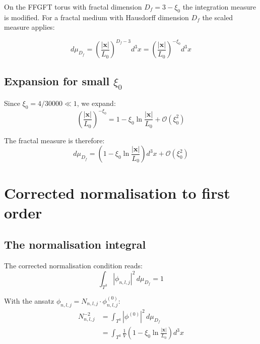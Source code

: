On the FFGFT torus with fractal dimension $D_f = 3-\xi_0$ the
integration measure is modified. For a fractal medium with
Hausdorff dimension $D_f$ the scaled measure applies:

\begin{equation}
  d\mu_{D_f} = \left(\frac{|\mathbf{x}|}{L_0}\right)^{D_f - 3} d^3x
  = \left(\frac{|\mathbf{x}|}{L_0}\right)^{-\xi_0} d^3x
  \label{eq:fraktales-mass}
\end{equation}

\subsection{Expansion for small \texorpdfstring{$\xi_0$}{xi0}}

Since $\xi_0 = 4/30000 \ll 1$, we expand:
\begin{equation}
  \left(\frac{|\mathbf{x}|}{L_0}\right)^{-\xi_0}
  = 1 - \xi_0 \ln\frac{|\mathbf{x}|}{L_0} + \mathcal{O}(\xi_0^2)
  \label{eq:entwicklung}
\end{equation}

The fractal measure is therefore:
\begin{equation}
  d\mu_{D_f} = \left(1 - \xi_0\ln\frac{|\mathbf{x}|}{L_0}\right)d^3x
  + \mathcal{O}(\xi_0^2)
  \label{eq:mass-entwickelt}
\end{equation}

\section{Corrected normalisation to first order}

\subsection{The normalisation integral}

The corrected normalisation condition reads:
\begin{equation}
  \int_{T^3}|\phi_{n,l,j}|^2\,d\mu_{D_f} = 1
\end{equation}

With the ansatz $\phi_{n,l,j} = N_{n,l,j} \cdot \phi^{(0)}_{n,l,j}$:
\begin{align}
  N_{n,l,j}^{-2}
  &= \int_{T^3}|\phi^{(0)}|^2\,d\mu_{D_f} \nonumber \\
  &= \int_{T^3}\frac{1}{V}\left(1 - \xi_0\ln\frac{|\mathbf{x}|}{L_0}\right)d^3x
  \label{eq:norm-integral}
\end{align}

